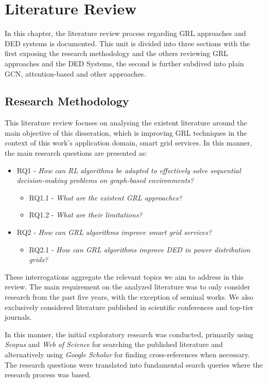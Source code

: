 \chapter{Literature Review} \label{chap:literature-review}

In this chapter, the literature review process regarding \ac{GRL} approaches and \ac{DED} systems is documented. This unit is divided into three sections with the first exposing the research methodology and the others reviewing \ac{GRL} approaches and the \ac{DED} Systems, the second is further subdived into plain \ac{GCN}, attention-based and other approaches.

\section{Research Methodology}

This literature review focuses on analysing the existent literature around the main objective of this disseration, which is improving \ac{GRL} techniques in the context of this work's application domain, smart grid services. In this manner, the main research questions are presented as:

\begin{itemize}
	\item RQ1 - \textit{How can \ac{RL} algorithms be adapted to effectively solve sequential decision-making problems on graph-based environments?} 
	\begin{itemize}
		\item RQ1.1 - \textit{What are the existent \ac{GRL} approaches?}
		\item RQ1.2 - \textit{What are their limitations? }
	\end{itemize}
	\item RQ2 - \textit{How can \ac{GRL} algorithms improve smart grid services?}
	\begin{itemize}
		\item RQ2.1 - \textit{How can \ac{GRL} algorithms improve \acf{DED} in power distribution grids?}
	\end{itemize}
\end{itemize}

These interrogations aggregate the relevant topics we aim to address in this review. The main requirement on the analyzed literature was to only consider research from the past five years, with the exception of seminal works. We also exclusively considered literature published in scientific conferences and top-tier journals. \par
In this manner, the initial exploratory research was conducted, primarily using \textit{Scopus} and \textit{Web of Science} for searching the published literature and alternatively using \textit{Google Scholar} for finding cross-references when necessary. 
The research questions were translated into fundamental search queries where the research process was based.


